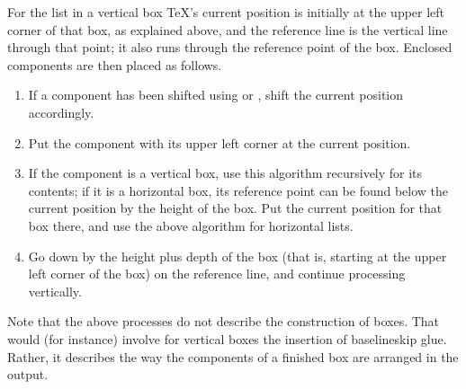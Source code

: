 \documentclass{book}
\begin{document}
For the list in a vertical box \TeX's  current position is
initially at the upper left corner of that box, as explained above,
and the reference line is the vertical line through that point;
it also runs through the reference point of the box.
Enclosed components are then placed as follows.
\begin{enumerate} \item If a component has been shifted using
 or , shift the current position
accordingly.
\item Put the component with its upper left corner at the
current position.
\item If the component is a vertical box, use this algorithm
recursively for its contents; if it is a horizontal box,
its reference point can be found below  the current position
by the height of the box. Put the current position for that
box there, and use the above algorithm for horizontal lists.
\item Go down by the height plus depth of the box
(that is, starting at the upper left corner of the box)
on the  reference line,
and continue processing vertically.
\end{enumerate}
Note that the above processes do not describe the construction
of boxes. That would (for instance)
involve for vertical boxes the insertion
of baselineskip glue. Rather, it describes the way the components
of a finished box are arranged in the output.
\end{document}
